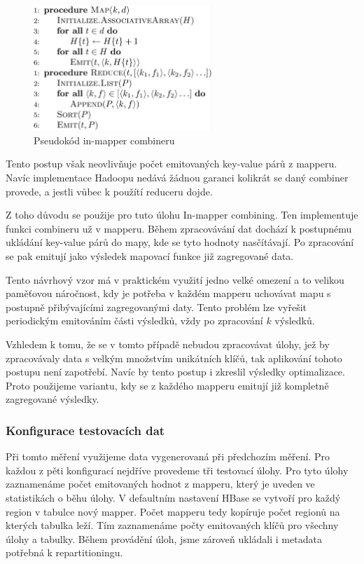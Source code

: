 \documentclass[thesis=M,czech]{FITthesis}[2012/06/26]
\begin{document}
\begin{figure}[h]\centering
	\includegraphics[width=0.6\textwidth, angle=0]{files/inmap}
	\caption[Pseudokód in-mapper combineru]
	{Pseudokód in-mapper combineru}\label{fig:inmap}
\end{figure}
Tento postup však neovlivňuje počet emitovaných  key-value párů z mapperu. Navíc  implementace Hadoopu nedává žádnou garanci kolikrát se daný combiner provede, a jestli vůbec k použítí reduceru dojde. 

Z toho důvodu se použije pro tuto úlohu In-mapper combining. Ten implementuje funkci combineru už v mapperu. Během zpracovávání dat dochází k postupnému ukládání key-value párů do mapy, kde se tyto hodnoty nasčítávají. Po zpracování se pak emitují jako výsledek mapovací funkce již zagregované data.

Tento návrhový vzor má v praktickém využití jedno velké omezení a to velikou paměťovou náročnost, kdy je potřeba v každém mapperu uchovávat mapu s postupně přibývajícími zagregovanými daty. Tento problém lze vyřešit periodickým emitováním části výsledků, vždy po zpracování $k$ výsledků. 

Vzhledem k tomu, že se v tomto případě nebudou zpracovávat úlohy, jež by zpracovávaly data s velkým množstvím unikátních klíčů, tak aplikování tohoto postupu není zapotřebí. Navíc by tento postup i zkreslil výsledky optimalizace. Proto použijeme variantu, kdy se z každého mapperu emitují již kompletně zagregované výsledky.

\subsubsection{Konfigurace testovacích dat}
Při tomto měření využijeme data vygenerovaná při předchozím měření. Pro každou z pěti konfigurací nejdříve provedeme tři testovací úlohy. Pro tyto úlohy zaznamenáme počet emitovaných hodnot z mapperu, který je uveden ve statistikách o běhu úlohy. V defaultním nastavení HBase se vytvoří pro každý region v tabulce nový mapper. Počet mapperu tedy kopíruje počet regionů na kterých tabulka leží. Tím zaznamenáme počty emitovaných klíčů pro všechny úlohy a tabulky. Během provádění úloh, jsme zároveň ukládali i metadata potřebná k repartitioningu.
\end{document}
